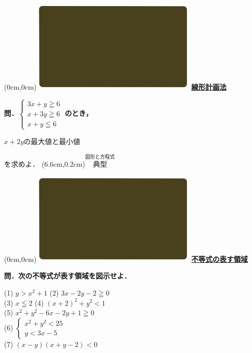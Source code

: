 \documentclass[10pt,
fleqn,
dvipdfmx,
uplatex
]{jsarticle}
\begin{document}
\at(0cm,0cm){\includegraphics[width=8cm,bb=0 0 1920 1080]{./media_local/smart_background/図形と方程式.jpeg}}
{\color{orange}\bf\boldmath\huge\underline{線形計画法}}\vspace{0.3zw}

\normalsize
\bf\boldmath 問．$\left\{\begin{array}{l}3x+y\geqq 6\;\\x+3y\geqq 6\;\\x+y\leqq 6\end{array}\right.$のとき，

\LARGE
\hspace{0.5zw}$x+2y$の最大値と最小値

\large
\hfill を求めよ．
\at(6.6cm,0.2cm){\small\color{bradorange}$\overset{\text{図形と方程式}}{\text{典型}}$}


\newpage



\at(0cm,0cm){\includegraphics[width=8cm,bb=0 0 1920 1080]{./media_local/smart_background/図形と方程式.jpeg}}
{\color{orange}\bf\boldmath\LARGE\underline{不等式の表す領域}}\vspace{0.3zw}

\large 
\bf\boldmath 問．次の不等式が表す領域を図示せよ．

\small
(1)  $y>x^2+1$ \hspace{1zw} (2)  $3x-2y-2\geqq 0$\\
(3)  $x\leqq 2$  \hspace{4zw} (4)  $\left(x+2\right)^2+y^2<1$\\
(5)  $x^2+y^2-6x-2y+1\geqq 0$\vspace{0.1zw}\\
(6)  $\left\{\begin{array}{l}x^2+y^2<{25}\\y<3x-5\end{array}\right.$\\
(7)  $\left(x-y\right)\left(x+y-2\right)<0$\\
\end{document}
